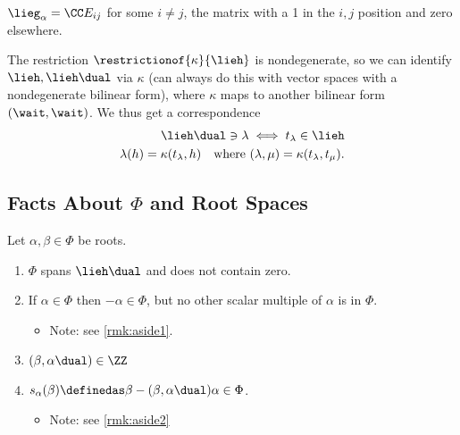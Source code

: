 \begin{example}[?]

\(\lieg_\alpha = \CC E_{ij}\) for some \(i\neq j\), the matrix with a 1
in the \(i,j\) position and zero elsewhere.

\end{example}

\begin{remark}

The restriction \(\restrictionof{\kappa}{\lieh}\) is nondegenerate, so
we can identify \(\lieh, \lieh\dual\) via \(\kappa\) (can always do this
with vector spaces with a nondegenerate bilinear form), where \(\kappa\)
maps to another bilinear form \((\wait, \wait)\). We thus get a
correspondence
\begin{align*}
\lieh\dual \ni \lambda \iff t_\lambda \in \lieh \\
\lambda(h) = \kappa(t_\lambda, h) \quad\text{where } (\lambda, \mu) = \kappa(t_\lambda, t_\mu)
.\end{align*}

\end{remark}

\hypertarget{facts-about-phi-and-root-spaces}{%
\subsection{\texorpdfstring{Facts About \(\Phi\) and Root
Spaces}{Facts About \textbackslash Phi and Root Spaces}}\label{facts-about-phi-and-root-spaces}}

\begin{definition}

Let \(\alpha, \beta \in \Phi\) be roots.

\begin{enumerate}
\def\labelenumi{\arabic{enumi}.}
\item
  \(\Phi\) spans \(\lieh\dual\) and does not contain zero.
\item
  If \(\alpha \in \Phi\) then \(-\alpha \in \Phi\), but no other scalar
  multiple of \(\alpha\) is in \(\Phi\).

  \begin{itemize}
  \tightlist
  \item
    Note: see \cref{rmk:aside1}.
  \end{itemize}
\item
  \((\beta, \alpha\dual) \in \ZZ\)
\item
  \(s_\alpha(\beta) \definedas \beta - (\beta, \alpha\dual)\alpha \in \Phi\).

  \begin{itemize}
  \tightlist
  \item
    Note: see \cref{rmk:aside2}
  \end{itemize}
\end{enumerate}

\end{definition}

